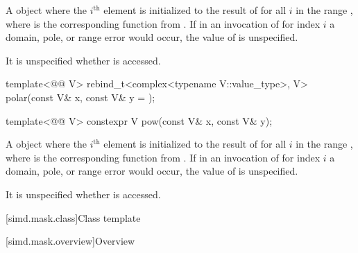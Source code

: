 \begin{itemdescr}
\pnum
\returns
A  object  where the $i^\text{th}$ element is
initialized to the result of  for all
$i$ in the range , where  is the
corresponding function from . If in an invocation of
 for index $i$ a domain, pole, or range error would
occur, the value of  is unspecified.

\pnum
\remarks
It is unspecified whether  is accessed.
\end{itemdescr}

\begin{itemdecl}
template<@@ V>
  rebind_t<complex<typename V::value_type>, V> polar(const V& x, const V& y = {});

template<@@ V> constexpr V pow(const V& x, const V& y);
\end{itemdecl}

\begin{itemdescr}
\pnum
\returns
A  object  where the $i^\text{th}$ element is
initialized to the result of 
for all $i$ in the range , where 
is the corresponding function from . If in an invocation of
 for index $i$ a domain, pole, or range error would
occur, the value of  is unspecified.

\pnum
\remarks
It is unspecified whether  is accessed.
\end{itemdescr}

[simd.mask.class]{Class template }

[simd.mask.overview]{Overview}


